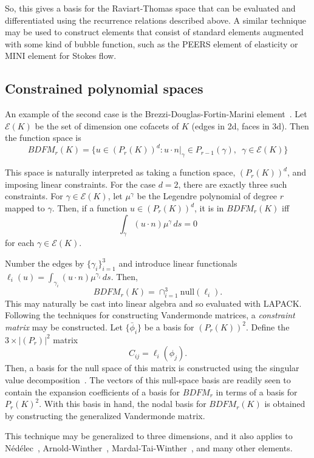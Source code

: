 So, this gives a basis for the Raviart-Thomas space that can be
evaluated and differentiated using the recurrence relations described
above.  A similar technique may be used to construct elements that
consist of standard elements augmented with some kind of bubble
function, such as
the PEERS element of elasticity or MINI element for Stokes flow.


\subsection{Constrained polynomial spaces}
An example of the second case is the Brezzi-Douglas-Fortin-Marini
element~\cite{BreFor91}.  Let \( \mathcal{E}(K) \) be the set of dimension one
cofacets of \( K \) (edges in 2d, faces in 3d).  Then the function
space is
\[
BDFM_r(K) = \{ u \in (P_r(K))^d : u\cdot n|_{\gamma} \in
P_{r-1}(\gamma), \, \, \, \gamma \in \mathcal{E}(K) \}
\]

This space is naturally interpreted as taking a function space,
\( (P_r(K))^d \), and imposing linear constraints.  For the case \( d
= 2 \), there are exactly three such constraints.  For \( \gamma
\in \mathcal{E}(K) \), let \( \mu^\gamma \) be the Legendre polynomial
of degree \( r \) mapped to \( \gamma \).  Then, if a function \( u
\in (P_r(K))^d \), it is in \( BDFM_r(K) \) iff
\[
\int_{\gamma} ( u \cdot n ) \mu^\gamma \, ds = 0
\]
for each \( \gamma \in \mathcal{E}(K) \).

Number the edges by \( \{ \gamma_i \}_{i=1}^3 \) and introduce
linear functionals \\
\( \ell_i(u) = \int_{\gamma_i} (u \cdot n)
\mu^{\gamma_i} \, ds \).  Then,
\[
BDFM_r(K) = \cap_{i=1}^3 \mathrm{null}(\ell_i).
\]
This may naturally be cast into linear algebra and so evaluated with
LAPACK.  Following the
techniques for constructing Vandermonde matrices, a \emph{constraint
  matrix} may be constructed.  Let \( \{ \bar{\phi}_i \} \) be a basis
for \( (P_r(K))^2 \).  Define the \( 3 \times |(P_r)|^2 \) matrix
\[
C_{ij} = \ell_i( \phi_j ).
\]
Then, a basis for the null space of this matrix is constructed using
the singular value decomposition~\cite{GolVan96}.  The vectors of this
null-space basis are readily seen to contain the expansion
coefficients of a basis for \( BDFM_r \) in terms of a basis for
\( P_r(K)^2 \).  With this basis in hand,
the nodal basis for \( BDFM_r(K) \) is obtained by constructing the
generalized Vandermonde matrix.

This technique may be generalized to three dimensions, and it also
applies to N\'ed\'elec~\cite{Ned80}, Arnold-Winther~\cite{ArnWin02},
Mardal-Tai-Winther~\cite{MarTai02},
and many other elements.

